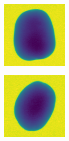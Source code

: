 \documentclass[11pt]{article}
\begin{document}
    \clearpage
    \begin{figure}[!h]
    \captionsetup[subfigure]{labelformat=empty}
    \ContinuedFloat
    \captionsetup{list=no}
    \begin{subfigure}[b]{0.22\textwidth}
         \centering
         \includegraphics[width=\textwidth]{figurer/potato_dataset/perfect/perfect_20.jpg}
         \caption{}
         \label{fig:perfect_20}
     \end{subfigure}
     \hfill
     \begin{subfigure}[b]{0.22\textwidth}
         \centering
         \includegraphics[width=\textwidth]{figurer/potato_dataset/perfect/perfect_21.jpg}

\end{subfigure}
\end{figure}
\end{document}
